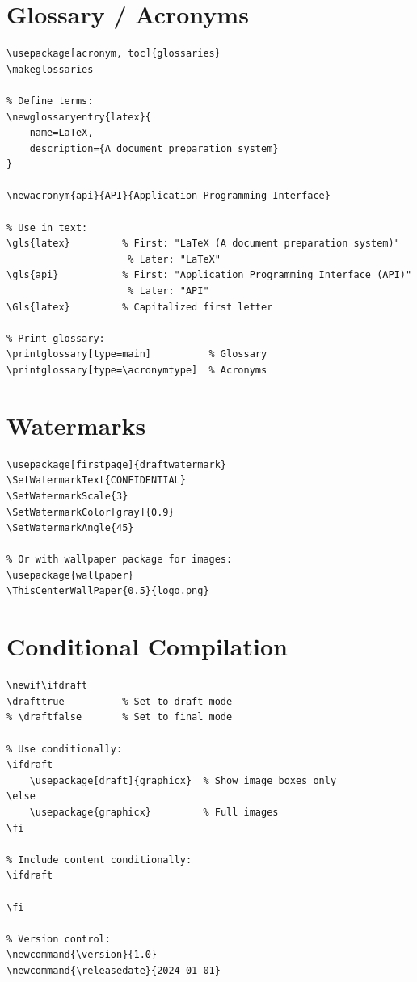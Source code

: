 \section{Glossary / Acronyms}

\begin{lstlisting}[language={[LaTeX]TeX}, caption=Glossary]
\usepackage[acronym, toc]{glossaries}
\makeglossaries

% Define terms:
\newglossaryentry{latex}{
    name=LaTeX,
    description={A document preparation system}
}

\newacronym{api}{API}{Application Programming Interface}

% Use in text:
\gls{latex}         % First: "LaTeX (A document preparation system)"
                     % Later: "LaTeX"
\gls{api}           % First: "Application Programming Interface (API)"
                     % Later: "API"
\Gls{latex}         % Capitalized first letter

% Print glossary:
\printglossary[type=main]          % Glossary
\printglossary[type=\acronymtype]  % Acronyms
\end{lstlisting}

\section{Watermarks}

\begin{lstlisting}[language={[LaTeX]TeX}, caption=Watermark]
\usepackage[firstpage]{draftwatermark}
\SetWatermarkText{CONFIDENTIAL}
\SetWatermarkScale{3}
\SetWatermarkColor[gray]{0.9}
\SetWatermarkAngle{45}

% Or with wallpaper package for images:
\usepackage{wallpaper}
\ThisCenterWallPaper{0.5}{logo.png}
\end{lstlisting}

\section{Conditional Compilation}

\begin{lstlisting}[language={[LaTeX]TeX}, caption=Conditional compilation]
% Define a flag:
\newif\ifdraft
\drafttrue          % Set to draft mode
% \draftfalse       % Set to final mode

% Use conditionally:
\ifdraft
    \usepackage[draft]{graphicx}  % Show image boxes only
\else
    \usepackage{graphicx}         % Full images
\fi

% Include content conditionally:
\ifdraft
    
\fi

% Version control:
\newcommand{\version}{1.0}
\newcommand{\releasedate}{2024-01-01}
\end{lstlisting}

